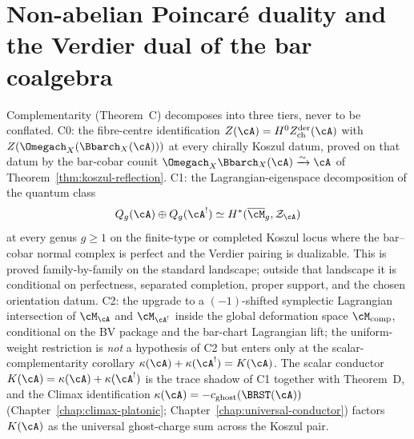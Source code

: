 \chapter{Non-abelian Poincaré duality and the Verdier dual of the bar coalgebra}
\label{chap:NAP-koszul-derivation}


\begin{remark}
\label{rem:theorem-c-three-tier-orientation}
Complementarity (Theorem~C) decomposes into three tiers, never
to be conflated.
\textsc{C0}: the fibre-centre identification
$Z(\cA)=H^0Z^{\mathrm{der}}_{\mathrm{ch}}(\cA)$ with
$Z(\Omegach_X(\Bbarch_X(\cA)))$ at every chirally Koszul datum,
proved on that datum by the bar-cobar counit
$\Omegach_X\Bbarch_X(\cA)\xrightarrow{\sim}\cA$
of Theorem~\ref{thm:koszul-reflection}.
\textsc{C1}: the Lagrangian-eigenspace decomposition of the
quantum class
\[
Q_g(\cA) \oplus Q_g(\cA^!)
\simeq H^*(\overline{\cM}_g,\mathcal{Z}_{\cA})
\]
at every genus $g \geq 1$ on the finite-type or completed Koszul
locus where the bar--cobar normal complex is perfect and the
Verdier pairing is dualizable. This is proved family-by-family
on the standard landscape; outside that landscape it is conditional
on perfectness, separated completion, proper support, and the chosen
orientation datum.
\textsc{C2}: the upgrade to a $(-1)$-shifted symplectic Lagrangian
intersection of $\cM_\cA$ and $\cM_{\cA^!}$ inside the global
deformation space $\cM_{\mathrm{comp}}$, conditional on the BV
package and the bar-chart Lagrangian lift; the uniform-weight
restriction is \emph{not} a hypothesis of \textsc{C2} but enters
only at the scalar-complementarity corollary
$\kappa(\cA) + \kappa(\cA^!) = K(\cA)$. The scalar conductor
$K(\cA) = \kappa(\cA) + \kappa(\cA^!)$ is the trace shadow of
\textsc{C1} together with Theorem~D, and the Climax identification
$\kappa(\cA) = -c_{\mathrm{ghost}}(\BRST(\cA))$
(Chapter~\ref{chap:climax-platonic};
Chapter~\ref{chap:universal-conductor}) factors $K(\cA)$ as the
universal ghost-charge sum across the Koszul pair.
\end{remark}

